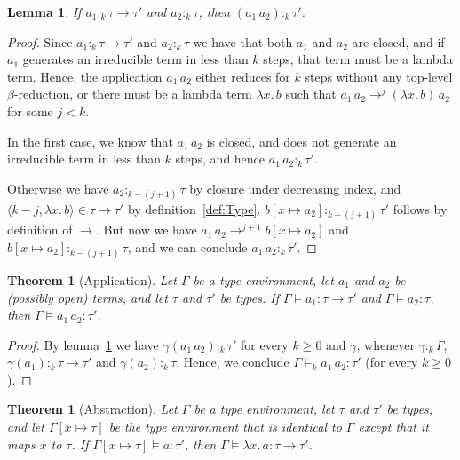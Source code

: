 \documentclass[10pt,a4paper,final,twocolumn]{article}
\theoremstyle{definition}
\theoremstyle{plain}
\newtheorem{lemma}[definition]{Lemma}
\newtheorem{theorem}[definition]{Theorem}
\newcommand{\abstr}[2]{\ensuremath{\lambda{#1}.\,{#2}}}
\newcommand{\app}[2]{\ensuremath{{#1}\,{#2}}}
\newcommand{\pair}[1]{\ensuremath{\langle{#1}\rangle}}
\begin{document}
\begin{lemma} \label{lem:Application}
  If $a_1 :_k \tau \to \tau'$ and $a_2 :_k \tau$, then $(\app{a_1}{a_2}) :_k \tau'$.
\end{lemma}

\begin{proof}
  Since $a_1 :_k \tau \to \tau'$ and $a_2 :_k \tau$ we have that both $a_1$ and $a_2$ are closed,
  and if $a_1$ generates an irreducible term in less than $k$ steps, that term must be a lambda
  term. Hence, the application $\app{a_1}{a_2}$ either reduces for $k$ steps without any top-level
  $\beta$-reduction, or there must be a lambda term $\abstr{x}{b}$ such that
  $\app{a_1}{a_2} \to^j \app{(\abstr{x}{b})}{a_2}$ for some $j < k$.

  In the first case, we know that $\app{a_1}{a_2}$ is closed, and does not generate an irreducible
  term in less than $k$ steps, and hence $\app{a_1}{a_2} :_k \tau'$.

  Otherwise we have \mbox{$a_2 :_{k-(j+1)} \tau$} by closure under decreasing index, and
  \mbox{$\pair{k-j,\abstr{x}{b}} \in \tau \to \tau'$} by definition~\ref{def:Type}.
  \mbox{$b[x \mapsto a_2] :_{k-(j+1)} \tau'$} follows by definition of $\to$. But now we have
  \mbox{$\app{a_1}{a_2} \to^{j+1} b[x \mapsto a_2]$} and \mbox{$b[x \mapsto a_2] :_{k-(j+1)} \tau$}, and
  we can conclude $\app{a_1}{a_2} :_k \tau'$.
\end{proof}

\begin{theorem}[Application] \label{thm:Application}
  Let $\Gamma$ be a type environment, let $a_1$ and $a_2$ be (possibly open) terms, and let
  $\tau$ and $\tau'$ be types. If \mbox{$\Gamma \models a_1 : \tau \to \tau'$} and
  \mbox{$\Gamma \models a_2 : \tau$}, then \mbox{$\Gamma \models \app{a_1}{a_2} : \tau'$}.
\end{theorem}

\begin{proof}
  By lemma~\ref{lem:Application} we have \mbox{$\gamma(\app{a_1}{a_2}) :_k \tau'$} for every $k \ge 0$
  and $\gamma$, whenever \mbox{$\gamma :_k \Gamma$},
  \mbox{$\gamma(a_1) :_k \tau \to \tau'$} and \mbox{$\gamma(a_2) :_k \tau$}. Hence, we conclude
  \mbox{$\Gamma \models_k \app{a_1}{a_2} : \tau'$} (for every $k \ge 0$).
\end{proof}

\begin{theorem}[Abstraction] \label{thm:Abstraction}
  Let $\Gamma$ be a type environment, let $\tau$ and $\tau'$ be types, and let $\Gamma[x \mapsto \tau]$
  be the type environment that is identical to $\Gamma$ except that it maps $x$ to $\tau$. If
  \mbox{$\Gamma[x \mapsto \tau] \models a : \tau'$}, then
  \mbox{$\Gamma \models \abstr{x}{a} : \tau \to \tau'$}.
\end{theorem}
\end{document}
